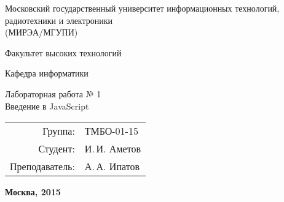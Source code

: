 \begin{titlepage}
\begin{center} %

\bfseries

	{\Large Московский государственный университет информационных технологий, радиотехники и электроники \\
	(МИРЭА/МГУПИ)
	
	} %

\vspace{48pt}


	{\large 
	  Факультет высоких технологий
	}


\vspace{36pt}


	{\large  {\comic Кафедра информатики}
	
	} %

\vspace{48pt}

{\large	\DoloresCyr Лабораторная работа № 1 \\
  \LARGE{Введение в JavaScript}
	
	}

\vspace{12pt}


\end{center} %

\vspace{60pt}

	\begin{flushright}
	  \begin{tabular}{rl}
            Группа: & ТМБО-01-15\\
			Студент: & И.\,И. Аметов \\
			Преподаватель: & А.\,А. Ипатов \\
		\end{tabular}
	\end{flushright}

\vfill

	\begin{center} %
		\bfseries
		Москва, 2015
	\end{center}
	
\end{titlepage} 

